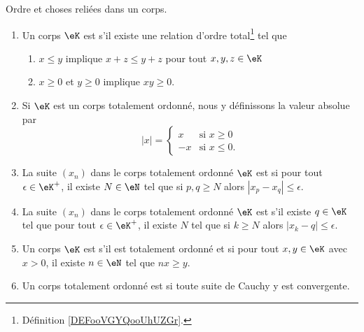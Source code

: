 \begin{definition}      \label{DefKCGBooLRNdJf}
    Ordre et choses reliées dans un corps.
    \begin{enumerate}
        \item \label{ITEMooOOOVooJWwIQr}
            Un corps \( \eK\) est  s'il existe une relation d'ordre total\footnote{Définition \ref{DEFooVGYQooUhUZGr}.} tel que
            \begin{enumerate}
                \item
                    \( x\leq y\) implique \( x+z\leq y+z\) pour tout \( x,y,z\in \eK\)
                \item   \label{CONDooBYYDooElXgPO}
                    \( x\geq 0\) et \( y\geq 0\) implique \( xy\geq 0\).
            \end{enumerate}
        \item       \label{ItemooWUGSooRSRvYC}
            Si \( \eK\) est un corps totalement ordonné, nous y définissons la valeur absolue par
            \begin{equation}
                | x |=\begin{cases}
                    x    &   \text{si }x\geq 0\\
                    -x    &    \text{si } x\leq 0.
                \end{cases}
            \end{equation}
        \item       \label{ItemVXOZooTYpcYN}
    La suite \( (x_n)\) dans le corps totalement ordonné \( \eK\) est  si pour tout \( \epsilon\in \eK^+\), il existe \( N\in \eN\) tel que si \( p,q\geq N\) alors \( | x_p-x_q |\leq \epsilon\).
        \item
    La suite \( (x_n)\) dans le corps totalement ordonné \( \eK\) est  s'il existe \( q\in \eK\) tel que pour tout \( \epsilon\in \eK^+\), il existe \( N\) tel que si \( k\geq N\) alors \( | x_k-q |\leq \epsilon\).
\item   \label{ItemooDZQKooPsqeRf}
            Un corps \( \eK\) est  s'il est totalement ordonné et si pour tout \( x,y\in \eK\) avec \( x>0\), il existe \( n\in \eN\) tel que \( nx\geq y\).
        \item       \label{ITEMooKZZYooDaidGU}
            Un corps totalement ordonné est  si toute suite de Cauchy y est convergente.
    \end{enumerate}
\end{definition}

